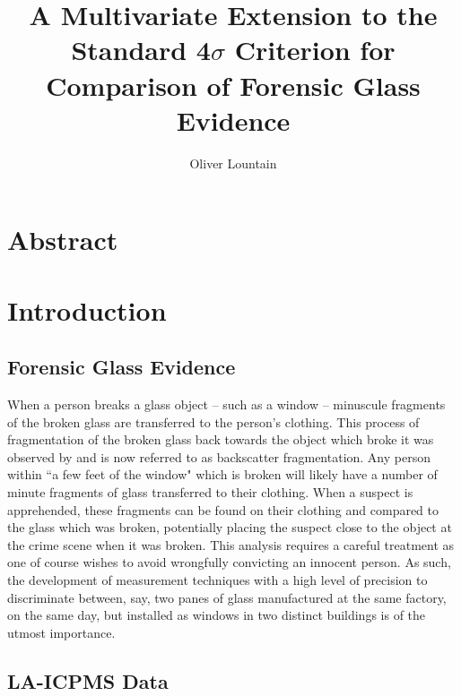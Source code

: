 \documentclass[a4paper]{article}
\begin{document}
\title{A Multivariate Extension to the Standard 4$\sigma$ Criterion for Comparison of Forensic Glass Evidence}
\author{Oliver Lountain}

\maketitle

\section*{Abstract}
\label{sec:abstract}



\tableofcontents


\section{Introduction}

\subsection{Forensic Glass Evidence}

When a person breaks a glass object -- such as a window --  minuscule fragments of the broken glass are transferred to the person's clothing. This process of fragmentation of the broken glass back towards the object which broke it was observed by \citet{Nelson1967} and is now referred to as backscatter fragmentation. Any person within ``a few feet of the window" which is broken will likely have a number of minute fragments of glass transferred to their clothing. When a suspect is apprehended, these fragments can be found on their clothing and compared to the glass which was broken, potentially placing the suspect close to the object at the crime scene when it was broken. This analysis requires a careful treatment as one of course wishes to avoid wrongfully convicting an innocent person. As such, the development of measurement techniques with a high level of precision to discriminate between, say, two panes of glass manufactured at the same factory, on the same day, but installed as windows in two distinct buildings is of the utmost importance.

\subsection{LA-ICPMS Data}
\end{document}
